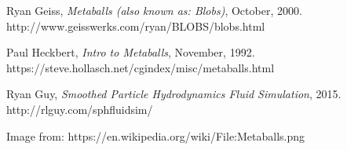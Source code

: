 \documentclass{article}
\begin{document}
\begin{thebibliography}{9}

  Ryan Geiss,
  \textit{Metaballs (also known as: Blobs)},
  October,
  2000.
  \\
  http://www.geisswerks.com/ryan/BLOBS/blobs.html

  Paul Heckbert,
  \textit{Intro to Metaballs},
  November,
  1992.
  \\
  https://steve.hollasch.net/cgindex/misc/metaballs.html


  Ryan Guy,
  \textit{Smoothed Particle Hydrodynamics Fluid Simulation},
  2015.
  \\
  http://rlguy.com/sphfluidsim/

  Image from: https://en.wikipedia.org/wiki/File:Metaballs.png

\end{thebibliography}
\end{document}
